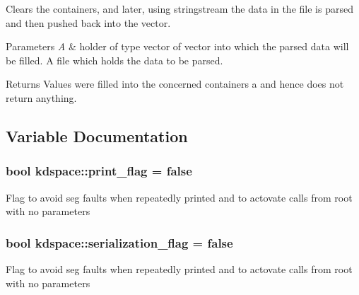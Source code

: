 Clears the containers, and later, using stringstream the data in the file is parsed and then pushed back into the vector. 


\begin{DoxyParams}{Parameters}
{\em A} & holder of type vector of vector into which the parsed data will be filled. A file which holds the data to be parsed. \\
\hline
\end{DoxyParams}
\begin{DoxyReturn}{Returns}
Values were filled into the concerned containers a and hence does not return anything. 
\end{DoxyReturn}


\subsection{Variable Documentation}
\hypertarget{namespacekdspace_a78984ac844171865e7f2c0747f8f5862}{
\subsubsection[{print\-\_\-flag}]{\setlength{\rightskip}{0pt plus 5cm}bool kdspace\-::print\-\_\-flag = false}}\label{namespacekdspace_a78984ac844171865e7f2c0747f8f5862}
Flag to avoid seg faults when repeatedly printed and to actovate calls from root with no parameters \hypertarget{namespacekdspace_a023c33dca0725913887ec75fe8f49373}{
\subsubsection[{serialization\-\_\-flag}]{\setlength{\rightskip}{0pt plus 5cm}bool kdspace\-::serialization\-\_\-flag = false}}\label{namespacekdspace_a023c33dca0725913887ec75fe8f49373}
Flag to avoid seg faults when repeatedly printed and to actovate calls from root with no parameters 